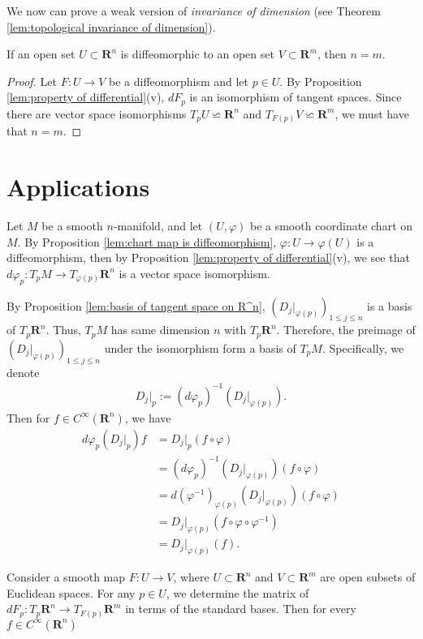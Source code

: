 We now can prove a weak version of \emph{invariance of dimension} (see Theorem \ref{lem:topological invariance of dimension}).

\begin{corollary}
    If an open set $U \subset \mathbf{R}^n$ is diffeomorphic to an open set $V \subset \mathbf{R}^m$, then $n = m$.
\end{corollary}

\begin{proof}
    Let $F : U \to V$ be a diffeomorphism and let $p \in U$. By Proposition \ref{lem:property of differential}(v), $dF_p$ is an isomorphism of tangent spaces. Since there are vector space isomorphisms $T_pU \backsimeq \mathbf{R}^n$ and $T_{F(p)}V \backsimeq \mathbf{R}^m$, we must have that $n = m$.
\end{proof}

\section{Applications}

Let $M$ be a smooth $n$-manifold, and let $(U, \varphi)$ be a smooth coordinate chart on $M$. By Proposition \ref{lem:chart map is diffeomorphism}, $\varphi : U \to \varphi(U)$ is a diffeomorphism, then by Proposition \ref{lem:property of differential}(v), we see that $d\varphi_p : T_pM \to T_{\varphi(p)}\mathbf{R}^n$ is a vector space isomorphism.

By Proposition \ref{lem:basis of tangent space on R^n}, $(D_{j}|_{\varphi(p)})_{1 \leq j \leq n}$ is a basis of $T_p\mathbf{R}^n$. Thus, $T_pM$ has same dimension $n$ with $T_p\mathbf{R}^n$. Therefore, the preimage of $(D_{j}|_{\varphi(p)})_{1 \leq j \leq n}$ under the isomorphism form a basis of $T_pM$. Specifically, we denote
    \begin{align*}
        D_{j}|_p := (d\varphi_p)^{-1}(D_{j}|_{\varphi(p)}).
    \end{align*}
Then for $f \in C^\infty(\mathbf{R}^n)$, we have
    \begin{align*}
        d\varphi_{p}(D_{j}|_p)f
        &= D_{j}|_p(f \circ \varphi)\\
        &= (d\varphi_p)^{-1}(D_{j}|_{\varphi(p)})(f \circ \varphi)\\
        &= d(\varphi^{-1})_{\varphi(p)}(D_{j}|_{\varphi(p)})(f \circ \varphi)\\
        &= D_{j}|_{\varphi(p)}(f \circ \varphi \circ \varphi^{-1})\\
        &= D_{j}|_{\varphi(p)}(f).
    \end{align*}


Consider a smooth map $F : U \to V$, where $U \subset \mathbf{R}^n$ and $V \subset \mathbf{R}^m$ are open subsets of Euclidean spaces. For any $p \in U$, we determine the matrix of $dF_p : T_p\mathbf{R}^n \to T_{F(p)}\mathbf{R}^m$ in terms of the standard bases. Then for every $f \in C^\infty(\mathbf{R}^n)$
